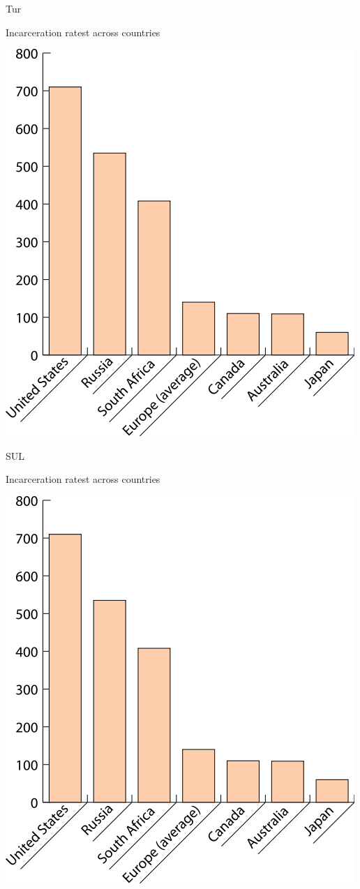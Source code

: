 \begin{map}{T}{ur}
\caption{Incarceration ratest across countries}
\label{chart:incarceration}
\includegraphics[width=\chartwidth,height=\chartheight]{incarceration}  
\end{map}

\begin{chart}{S}{UL}
\caption{Incarceration ratest across countries}
\label{chart:incarceration}
\includegraphics[width=\chartwidth,height=\chartheight]{incarceration}  
\end{chart}

